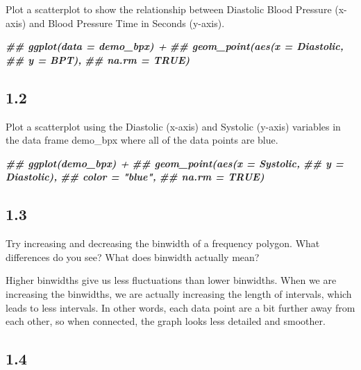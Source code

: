 \documentclass[
]{book}
\newenvironment{Shaded}{\begin{snugshade}}{\end{snugshade}}
\newcommand{\DocumentationTok}[1]{\textcolor[rgb]{0.56,0.35,0.01}{\textbf{\textit{#1}}}}
\begin{document}
Plot a scatterplot to show the relationship between Diastolic Blood Pressure (x-axis) and Blood Pressure Time in Seconds (y-axis).

\begin{Shaded}
\begin{Highlighting}[]
\DocumentationTok{\#\# ggplot(data = demo\_bpx) +}
\DocumentationTok{\#\#   geom\_point(aes(x = Diastolic, }
\DocumentationTok{\#\#                  y = BPT), }
\DocumentationTok{\#\#              na.rm = TRUE)}
\end{Highlighting}
\end{Shaded}

\hypertarget{section-29}{%
\subsection{1.2}\label{section-29}}

Plot a scatterplot using the Diastolic (x-axis) and Systolic (y-axis) variables in the data frame demo\_bpx where all of the data points are blue.

\begin{Shaded}
\begin{Highlighting}[]
\DocumentationTok{\#\# ggplot(demo\_bpx) +}
\DocumentationTok{\#\#   geom\_point(aes(x = Systolic, }
\DocumentationTok{\#\#                  y = Diastolic), }
\DocumentationTok{\#\#              color = "blue",}
\DocumentationTok{\#\#              na.rm = TRUE)}
\end{Highlighting}
\end{Shaded}

\hypertarget{section-30}{%
\subsection{1.3}\label{section-30}}

Try increasing and decreasing the binwidth of a frequency polygon. What differences do you see? What does binwidth actually mean?

Higher binwidths give us less fluctuations than lower binwidths. When we are increasing the binwidths, we are actually increasing the length of intervals, which leads to less intervals. In other words, each data point are a bit further away from each other, so when connected, the graph looks less detailed and smoother.

\hypertarget{section-31}{%
\subsection{1.4}\label{section-31}}
\end{document}
